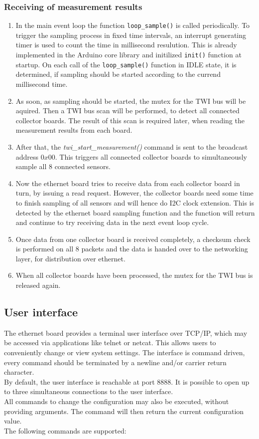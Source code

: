 \documentclass[a4paper]{scrreprt}
\begin{document}
\subsubsection{Receiving of measurement results}
\begin{enumerate}
  \item In the main event loop the function \texttt{loop\_sample()} is called periodically. To trigger the sampling process in fixed time
    intervals, an interrupt generating timer is used to count the time in millisecond resulution. This is already implemented in the Arduino core library
    and initilized \texttt{init()} function at startup.
    On each call of the \texttt{loop\_sample()} function in IDLE state, it is determined, if sampling should be started according to the
    currend millisecond time.
  \item As soon, as sampling should be started, the mutex for the TWI bus will be aquired. Then a TWI bus scan will be performed, to detect
    all connected collector boards. The result of this scan is required later, when reading the measurement results from each board.
  \item After that, the \emph{twi\_start\_measurement()} command is sent to the broadcast address $0x00$. This triggers all connected collector
    boards to simultaneously sample all 8 connected sensors.
  \item Now the ethernet board tries to receive data from each collector board in turn, by issuing a read request. However, the collector boards
    need some time to finish sampling of all sensors and will hence do I2C clock extension. This is detected by the ethernet board
    sampling function and the function will return and continue to try receiving data in the next event loop cycle.
  \item Once data from one collector board is received completely, a checksum check is performed on all 8 packets and the data is
    handed over to the networking layer, for distribution over ethernet.
  \item When all collector boards have been processed, the mutex for the TWI bus is released again.
\end{enumerate}

\subsection{User interface}
The ethernet board provides a terminal user interface over TCP/IP, which may be accessed via applications like telnet or netcat.
This allows users to conveniently change or view system settings. The interface is command driven, every command should be terminated
by a newline and/or carrier return character.\\
By default, the user interface is reachable at port 8888.
It is possible to open up to three simultaneous connections to the user interface.\\
All commands to change the configuration may also be executed, without providing
arguments. The command will then return the current configuration value.\\
The following commands are supported:
\end{document}
